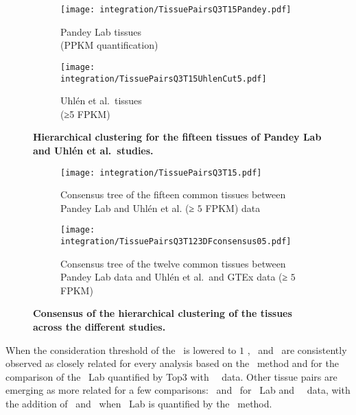 \begin{figure}[!htpb]
    \begin{subfigure}[b]{0.53\textwidth}
        \captionsetup{margin=0.6cm,justification=centering}
        \centering \texttt{[image: integration/TissuePairsQ3T15Pandey.pdf]}
        \caption{Pandey Lab tissues\\(PPKM quantification)}\label{fig:treePandeyQ3T15}
    \end{subfigure}%
    \begin{subfigure}[b]{0.53\textwidth}
        \captionsetup{margin=0.6cm,justification=centering}
        \centering \texttt{[image: integration/TissuePairsQ3T15UhlenCut5.pdf]}
        \caption{Uhlén et al.\ tissues\\(≥5 FPKM)}\label{fig:treeUhlenQ3T15cuth5}
    \end{subfigure}
    \vspace{-5mm}
    \caption[Tissues hierachical clustering for Pandey Lab and Uhlén \etal\ data]{\label{fig:separateTree}%
    \textbf{Hierarchical clustering for the fifteen tissues of
    Pandey Lab and Uhlén et al.\ studies.}
    }
\end{figure}

\begin{figure}[!htpb]
    \begin{subfigure}[b]{0.53\textwidth}
        \captionsetup{margin=0.6cm}
        \centering \texttt{[image: integration/TissuePairsQ3T15.pdf]}
        \caption{Consensus tree of the fifteen common tissues between Pandey Lab
        and Uhlén et al. (≥ $5$ FPKM) data}\label{fig:consensus2D15TQ3}
    \end{subfigure}%
    \begin{subfigure}[b]{0.53\textwidth}
        \captionsetup{margin=0.6cm}
        \centering \texttt{[image: integration/TissuePairsQ3T123DFconsensus05.pdf]}
        \caption{Consensus tree of the twelve common tissues
        between Pandey Lab data and
        Uhlén et al.\ and GTEx data (≥ $5$ FPKM)}\label{fig:consensusTree05}
    \end{subfigure}
    \vspace{-5mm}
    \caption[Tissues hierachical clustering for Pandey Lab and Uhlén \etal\ data]{\label{fig:consensusTrees}%
    \textbf{Consensus of the hierarchical clustering of the tissues across the different studies.}
    }
\end{figure}

When the consideration threshold of the \mRNAs\ is lowered to $1$ \FPKM,
\Liver\ and \Kidney\ are consistently observed as closely related
for every analysis based on the \PPKM\ method and
for the comparison of
the \pandey\ Lab quantified by Top3 with \uhlen\ \etal\ data.
Other tissue pairs are emerging as more related for a few comparisons:
\Rectum\ and \hColon\ for \pandey\ Lab and \uhlen\ \etal\ data,
with the addition of \Pancreas\ and \Gall\
when \pandey\ Lab is quantified by the \PPKM\ method.

